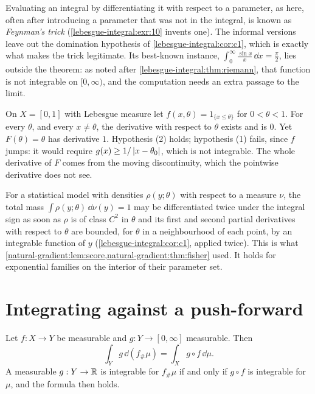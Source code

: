 \begin{notechapter}
Evaluating an integral by differentiating it with respect to a
parameter, as here, often after introducing a parameter that was not in
the integral, is known as \emph{Feynman's trick}
(\cref{lebesgue-integral:exr:10} invents one). The informal versions
leave out the domination hypothesis of \cref{lebesgue-integral:cor:c1},
which is exactly what makes the trick legitimate. Its best-known
instance, $\int_0^\infty\frac{\sin x}x\,\dd x = \frac\pi2$, lies outside
the theorem: as noted after \cref{lebesgue-integral:thm:riemann}, that
function is not integrable on $[0, \infty)$, and the computation needs
an extra passage to the limit.

\begin{pitfall}
On $X = [0, 1]$ with Lebesgue measure let
$f(x, \theta) = 1_{\{x\leq\theta\}}$ for $0 < \theta < 1$. For every
$\theta$, and every $x\neq\theta$, the derivative with respect to
$\theta$ exists and is $0$. Yet $F(\theta) = \theta$ has derivative $1$.
Hypothesis (2) holds; hypothesis (1) fails, since $f$ jumps: it would
require $g(x)\geq1/\left|x - \theta_0\right|$, which is not integrable. The
whole derivative of $F$ comes from the moving discontinuity, which the
pointwise derivative does not see.
\end{pitfall}

\begin{remark}\label{lebesgue-integral:rem:regular}
For a statistical model with densities $\rho(y; \theta)$ with respect to
a measure $\nu$, the total mass $\int\rho(y; \theta)\,\dd\nu(y) = 1$ may
be differentiated twice under the integral sign as soon as $\rho$ is of
class $C^2$ in $\theta$ and its first and second partial derivatives
with respect to $\theta$ are bounded, for $\theta$ in a neighbourhood of
each point, by an integrable function of $y$
(\cref{lebesgue-integral:cor:c1}, applied twice). This
is what \cref{natural-gradient:lem:score,natural-gradient:thm:fisher}
used. It holds for exponential families on the interior of their
parameter set.
\end{remark}

\section{Integrating against a push-forward}
\label{lebesgue-integral:sec:pushforward}

\begin{theorem}[Transfer]\label{lebesgue-integral:thm:transfer}
Let $f:X\to Y$ be measurable and $g:Y\to[0, \infty]$ measurable. Then
\[
  \int_Yg\,\dd(f_\#\mu) = \int_Xg\circ f\,\dd\mu .
\]
A measurable $g:Y\to\mathbb{R}$ is integrable for $f_\#\mu$ if and only if
$g\circ f$ is integrable for $\mu$, and the formula then holds.
\end{theorem}


\end{notechapter}
